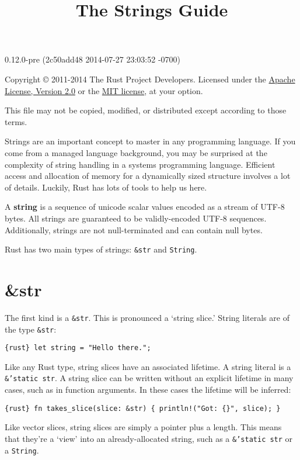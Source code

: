 \documentclass[]{article}
\title{The Strings Guide}
\begin{document}
\maketitle

0.12.0-pre (2c50add48 2014-07-27 23:03:52 -0700)

Copyright © 2011-2014 The Rust Project Developers. Licensed under the
\href{http://www.apache.org/licenses/LICENSE-2.0}{Apache License,
Version 2.0} or the \href{http://opensource.org/licenses/MIT}{MIT
license}, at your option.

This file may not be copied, modified, or distributed except according
to those terms.

{
\hypersetup{linkcolor=black}
\setcounter{tocdepth}{3}
\tableofcontents
}
Strings are an important concept to master in any programming language.
If you come from a managed language background, you may be surprised at
the complexity of string handling in a systems programming language.
Efficient access and allocation of memory for a dynamically sized
structure involves a lot of details. Luckily, Rust has lots of tools to
help us here.

A \textbf{string} is a sequence of unicode scalar values encoded as a
stream of UTF-8 bytes. All strings are guaranteed to be validly-encoded
UTF-8 sequences. Additionally, strings are not null-terminated and can
contain null bytes.

Rust has two main types of strings: \texttt{\&str} and \texttt{String}.

\section{\&str}\label{str}

The first kind is a \texttt{\&str}. This is pronounced a `string slice.'
String literals are of the type \texttt{\&str}:

\texttt{\{rust\} let string = "Hello there.";}

Like any Rust type, string slices have an associated lifetime. A string
literal is a \texttt{\&'static str}. A string slice can be written
without an explicit lifetime in many cases, such as in function
arguments. In these cases the lifetime will be inferred:

\texttt{\{rust\} fn takes\_slice(slice: \&str) \{     println!("Got: \{\}", slice); \}}

Like vector slices, string slices are simply a pointer plus a length.
This means that they're a `view' into an already-allocated string, such
as a \texttt{\&'static str} or a \texttt{String}.
\end{document}
